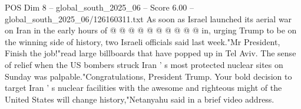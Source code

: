 \begin{textsample}{POS Dim 8 – global\_south\_2025\_06 – Score 6.00 – global\_south\_2025\_06/126160311.txt}
As soon as Israel launched its aerial war on Iran in the early hours of @ @ @ @ @ @ @ @ @ @ in, urging Trump to be on the winning side of history, two Israeli officials said last week."Mr President, Finish the job!"read large billboards that have popped up in Tel Aviv.
The sense of relief when the US bombers struck Iran ' s most protected nuclear sites on Sunday was palpable."Congratulations, President Trump.
Your bold decision to target Iran ' s nuclear facilities with the awesome and righteous might of the United States will change history,"Netanyahu said in a brief video address.

\end{textsample}
